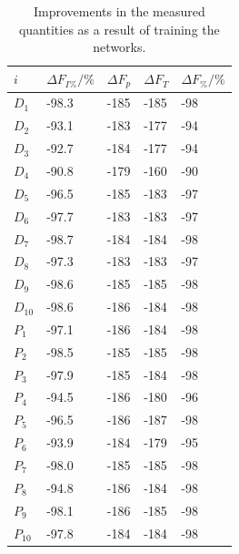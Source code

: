 \documentclass[12pt, titlepage]{report}
\theoremstyle{definition}
\begin{document}
{\begin{table}[H]
    \begin{tabularx}{\textwidth}{lXXXX} \toprule
    {$i$}  & {$\Delta F_{I\%} / \%$}	            & {$\Delta F_p$} 	    & {$\Delta F_T$} 	        & {$\Delta F_{\%} / \%$} \\ \midrule
    $D_1$  & -98.3 							& -185 					& -185    	 				& -98 \\
    $D_2$  & -93.1 							& -183 					& -177  					& -94 \\
    $D_3$  & -92.7							& -184 					& -177  					& -94 \\
    $D_4$  & -90.8 							& -179 					& -160 					    & -90 \\
    $D_5$  & -96.5 							& -185 					& -183						& -97 \\
    $D_6$  & -97.7 							& -183 					& -183	  					& -97 \\
    $D_7$  & -98.7 							& -184 					& -184	  					& -98 \\
    $D_8$  & -97.3 							& -183 					& -183	  					& -97 \\
    $D_9$  & -98.6 							& -185 					& -185	  					& -98 \\
    $D_{10}$ & -98.6 						& -186 					& -184	  					& -98 \\ \midrule
    $P_1$  & -97.1  						& -186 					& -184		 				& -98 \\
    $P_2$  & -98.5  						& -185 					& -185	  					& -98 \\
    $P_3$  & -97.9 							& -185 					& -184	  					& -98 \\
    $P_4$  & -94.5  						& -186 					& -180  					& -96 \\
    $P_5$  & -96.5 							& -186 					& -187	   					& -98 \\
    $P_6$  & -93.9  						& -184 					& -179  					& -95 \\
    $P_7$  & -98.0  						& -185 					& -185	  					& -98 \\
    $P_8$  & -94.8  						& -186 					& -184	  					& -98 \\
    $P_9$  & -98.1  						& -186 					& -185	  					& -98 \\
    $P_{10}$ & -97.8  						& -184 					& -184						& -98 \\ \bottomrule
\end{tabularx}
\caption[Result improvement from before to after training]{Improvements in the measured quantities as a result of training the networks.}
\label{table:training_change}
\end{table}


}
\end{document}
